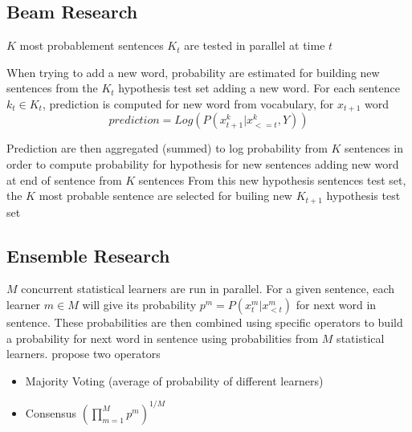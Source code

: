 \documentclass[a4paper]{article}
\begin{document}
\subsection{Beam Research}
$K$ most probablement sentences $K_{t}$ are tested in parallel at time $t$

When trying to add a new word, probability are estimated for building new sentences from the $K_{t}$ hypothesis test set adding a new word. For each sentence $k_{t} \in K_{t}$, prediction is computed for new word from vocabulary, for $x_{t+1}$ word
\begin{equation}
prediction = Log(P(x_{t+1}^{k} \vert x_{<=t}^{k},Y))
\end{equation}

Prediction are then aggregated (summed) to log probability from $K$ sentences in order to compute probability for hypothesis for new sentences adding new word at end of sentence from $K$ sentences
From this new hypothesis sentences test set, the $K$ most probable sentence are selected for builing new $K_{t+1}$ hypothesis test set 

\subsection{ Ensemble Research}

$M$ concurrent statistical learners are run in parallel. For a given sentence, each learner $m \in M$ will give its probability $p^{m} = P(x_{t}^{m} \vert x_{<t}^{m})$ for next word in sentence. These probabilities are then combined using specific operators to build a probability for next word in sentence using probabilities from $M$ statistical learners. \citep{luong2016} propose two operators
\begin{itemize}
\item Majority Voting (average of probability of different learners)
\item Consensus $(\prod_{m=1}^{M} p^{m})^{1 / M}$

\end{itemize}
\end{document}
